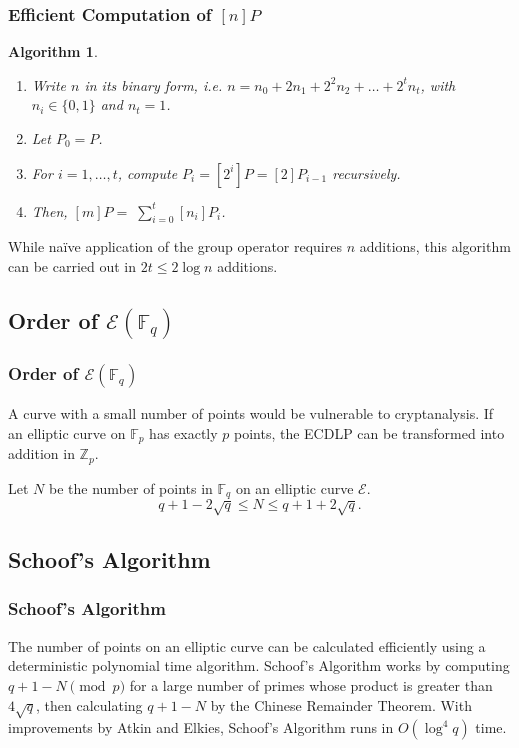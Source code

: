 \documentclass{beamer}
\newtheorem{algorithm}{Algorithm}
\begin{document}
    \begin{frame}
        \frametitle{Efficient Computation of \([n]P\)}
        \begin{algorithm}
            \begin{enumerate}
                \item Write \(n\) in its binary form, i.e.
                    \(n = n_0 + 2n_1 + 2^2n_2 + \dots + 2^tn_t\),
                    with \(n_i \in \{0, 1\}\) and \(n_t = 1\).
                \item Let \(P_0 = P\).
                \item For \(i = 1, \dots, t\), compute \(P_i = [2^i]P =
                    [2]P_{i - 1}\) recursively.
                \item Then, \([m]P =\sum _{i = 0} ^t [n_i]P_i\).
            \end{enumerate}
        \end{algorithm}
        \vfill
        While na\"{i}ve application of the group operator
        requires \(n\) additions, this algorithm can be carried out
        in \(2t \leq 2 \log n\) additions.
    \end{frame} %

    \subsection{Order of \(\mathcal{E}(\mathbb{F}_q)\)}
    \begin{frame}
        \frametitle{Order of \(\mathcal{E}(\mathbb{F}_q)\)}
        A curve with a small number of points would be vulnerable to
        cryptanalysis.
        \vfill
        If an elliptic curve on \(\mathbb{F}_p\) has exactly \(p\) points,
        the ECDLP can be transformed into addition in \(\mathbb{Z}_p\).
        \vfill
        \begin{definition}
            Let \(N\) be the number of points in \(\mathbb{F}_q\)
            on an elliptic curve \(\mathcal{E}\).
            \[q + 1 - 2\sqrt{q} \leq N \leq q + 1 + 2\sqrt{q}.\]
        \end{definition}
    \end{frame}

    \subsection{Schoof's Algorithm}
    \begin{frame}
        \frametitle{Schoof's Algorithm}
        The number of points on an elliptic curve can be calculated
        efficiently using a deterministic polynomial time algorithm.
        \vfill
        Schoof's Algorithm works by computing \(q + 1 - N \pmod p\) for
        a large number of primes whose product is greater than \(4\sqrt{q}\),
        then calculating \(q + 1 - N\) by the Chinese Remainder Theorem.
        \vfill
        With improvements by Atkin and Elkies, Schoof's Algorithm
        runs in \(O(\log^4 q)\) time.
    \end{frame}
\end{document}
